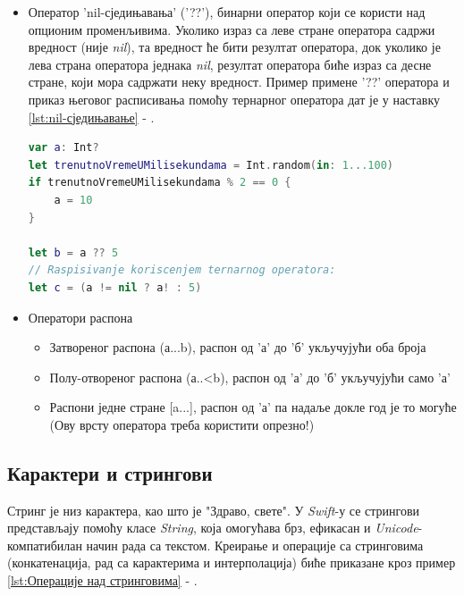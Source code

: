 \documentclass[12pt,oneside]{memoir}
\begin{document}
\begin{itemize}
    \item Оператор 'nil-сједињавања' ('??'), бинарни оператор који се користи над опционим променљивима. Уколико израз са леве стране оператора садржи вредност (није \textit{nil}), та вредност ће бити резултат оператора, док уколико је лева страна оператора једнака  \textit{nil}, резултат оператора биће израз са десне стране, који мора садржати неку вредност. Пример примене '??' оператора и приказ његовог расписивања помоћу тернарног оператора дат је у наставку \ref{lst:nil-сједињавање} - .
    
\begin{lstlisting}[caption=\textit{{nil-сједињавање}}, label={lst:nil-сједињавање}, language=Swift, frame=single]
var a: Int?
let trenutnoVremeUMilisekundama = Int.random(in: 1...100)
if trenutnoVremeUMilisekundama % 2 == 0 {
    a = 10
}

let b = a ?? 5
// Raspisivanje koriscenjem ternarnog operatora:
let c = (a != nil ? a! : 5)
\end{lstlisting}
    
    \item Оператори распона
    
\begin{itemize}
    \item Затвореног распона (а...b), распон од 'а' до 'б' укључујући оба броја
    \item Полу-отвореног распона (а..<b), распон од 'а' до 'б' укључујући само 'а'
    \item Распони једне стране [a...], распон од 'а' па надаље докле год је то могуће (Ову врсту оператора треба користити опрезно!)
\end{itemize}

\end{itemize}

\subsection{Карактери и стрингови}

\indent Стринг је низ карактера, као што је "Здраво, свете". У \textit{Swift}-у се стрингови представљају помоћу класе \textit{String}, која омогућава брз, ефикасан и \textit{Unicode}-компатибилан начин рада са текстом. Креирање и операције са стринговима (конкатенација, рад са карактерима и интерполација) биће приказане кроз пример \ref{lst:Операције над стринговима} - .
\end{document}
